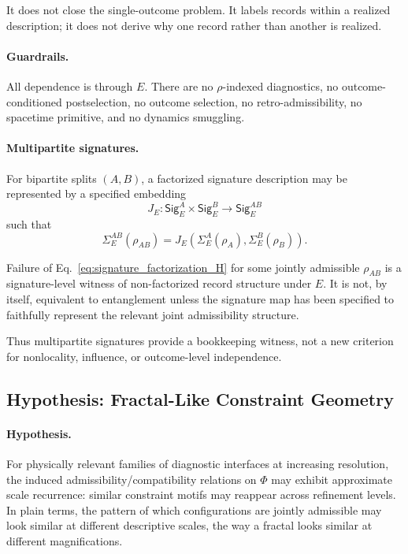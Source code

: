 \documentclass[aps,prx,onecolumn,11pt]{revtex4-2}
\theoremstyle{plain}
\theoremstyle{definition}
\theoremstyle{remark}
\begin{document}
It does not close the single-outcome problem. It labels records within
a realized description; it does not derive why one record rather than
another is realized.

\paragraph{Guardrails.}

All dependence is through \(E\). There are no \(\rho\)-indexed
diagnostics, no outcome-conditioned postselection, no outcome selection,
no retro-admissibility, no spacetime primitive, and no dynamics
smuggling.

\paragraph{Multipartite signatures.}

For bipartite splits \((A,B)\), a factorized signature description may
be represented by a specified embedding
\[
J_E:\mathsf{Sig}^A_E\times\mathsf{Sig}^B_E
\longrightarrow
\mathsf{Sig}^{AB}_E
\]
such that
\begin{equation}
\Sigma^{AB}_E(\rho_{AB})
=
J_E\!\left(
\Sigma^A_E(\rho_A),
\Sigma^B_E(\rho_B)
\right).
\label{eq:signature_factorization_H}
\end{equation}

Failure of Eq.~\eqref{eq:signature_factorization_H} for some jointly
admissible \(\rho_{AB}\) is a signature-level witness of
non-factorized record structure under \(E\). It is not, by itself,
equivalent to entanglement unless the signature map has been specified
to faithfully represent the relevant joint admissibility structure.

Thus multipartite signatures provide a bookkeeping witness, not a new
criterion for nonlocality, influence, or outcome-level independence.

\subsection{Hypothesis: Fractal-Like Constraint Geometry}
\label{hyp:fractal_joint_admissibility}

\paragraph{Hypothesis.}

For physically relevant families of diagnostic interfaces at increasing
resolution, the induced admissibility/compatibility relations on
\(\Phi\) may exhibit approximate scale recurrence: similar constraint
motifs may reappear across refinement levels. In plain terms, the
pattern of which configurations are jointly admissible may look similar
at different descriptive scales, the way a fractal looks similar at
different magnifications.
\end{document}
